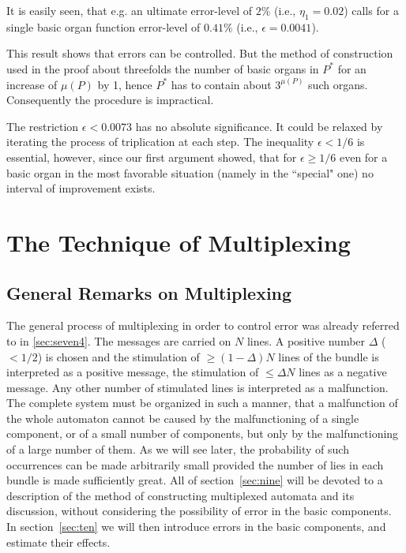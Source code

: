 \documentclass[twocolumn,preprintnumbers,amsmath,amssymb,floatfix]{revtex4}
\begin{document}
\noindent It is easily seen, that e.g. an ultimate error-level of
$2\%$ (i.e., $\eta_1=0.02$) calls for a single basic organ
function error-level of $0.41\%$ (i.e., $\epsilon=0.0041$).

This result shows that errors can be controlled. But the method of
construction used in the proof about threefolds the number of
basic organs in $P^*$ for an increase of $\mu(P)$ by 1, hence
$P^*$ has to contain about $3^{\mu(P)}$ such organs. Consequently
the procedure is impractical.

The restriction $\epsilon<0.0073$ has no absolute significance. It
could be relaxed by iterating the process of triplication at each
step. The inequality $\epsilon < 1/6$ is essential, however, since
our first argument showed, that for $\epsilon\geq1/6$ even for a
basic organ in the most favorable situation (namely in the
``special" one) no interval of improvement exists.

\section{\label{sec:nine}The Technique of Multiplexing}

\subsection{\label{sec:nine1}General Remarks on Multiplexing}

The general process of multiplexing in order to control error was
already referred to in \ref{sec:seven4}. The messages are carried
on $N$ lines. A positive number $\Delta$ ($<1/2$) is chosen and
the stimulation of $\geq (1-\Delta)N$ lines of the bundle is
interpreted as a positive message, the stimulation of $\leq \Delta
N$ lines as a negative message. Any other number of stimulated
lines is interpreted as a malfunction. The complete system must be
organized in such a manner, that a malfunction of the whole
automaton cannot be caused by the malfunctioning of a single
component, or of a small number of components, but only by the
malfunctioning of a large number of them. As we will see later,
the probability of such occurrences can be made arbitrarily small
provided the number of lies in each bundle is made sufficiently
great. All of section~\ref{sec:nine} will be devoted to a
description of the method of constructing multiplexed automata and
its discussion, without considering the possibility of error in
the basic components. In section~\ref{sec:ten} we will then
introduce errors in the basic components, and estimate their
effects.
\end{document}
